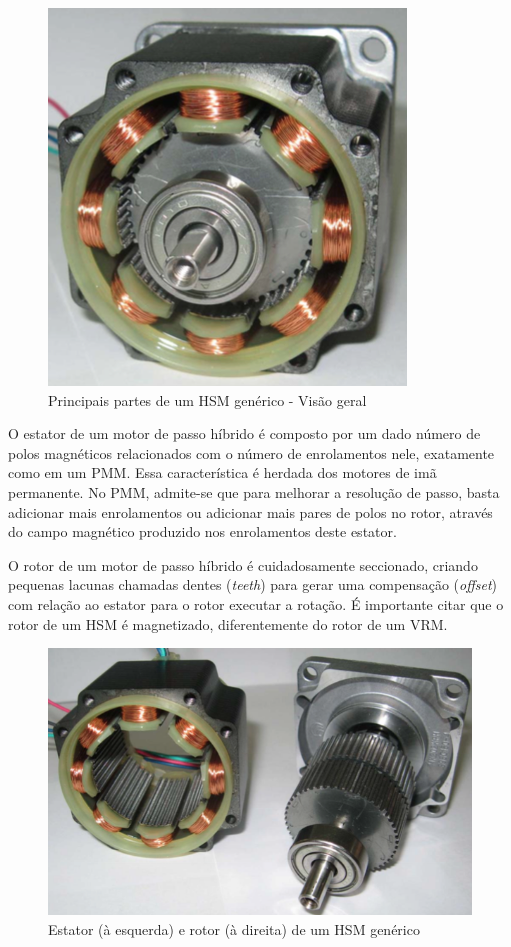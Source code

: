\documentclass[portugues]{sobraep}
\begin{document}
	\begin{figure}[!h]
		\centering
		\includegraphics[scale=.45]{Images/hsmreal1.png}
		\caption{Principais partes de um HSM genérico - Visão geral \cite{ieeeRusso}}
		\label{HSMreal}
	\end{figure} 
	
	O estator de um motor de passo híbrido é composto por um dado número de polos magnéticos relacionados com o número de enrolamentos nele, exatamente como em um PMM. Essa característica é herdada dos motores de imã permanente. No PMM, admite-se que para melhorar a resolução de passo, basta adicionar mais enrolamentos ou adicionar mais pares de polos no rotor, através do campo magnético produzido nos enrolamentos deste estator. 
	
	O rotor de um motor de passo híbrido é cuidadosamente seccionado, criando pequenas lacunas chamadas dentes (\textit{teeth}) para gerar uma compensação (\textit{offset}) com relação ao estator para o rotor executar a rotação. É importante citar que o rotor de um HSM é magnetizado, diferentemente do rotor de um VRM.
	
	\begin{figure}[!h]
		\centering
		\includegraphics[scale=.4]{Images/hsmreal2.png}
		\caption{Estator (à esquerda) e rotor (à direita) de um HSM genérico \cite{ieeeRusso}}
		\label{HSMestatorrotor}
	\end{figure} 
	
\end{document}
